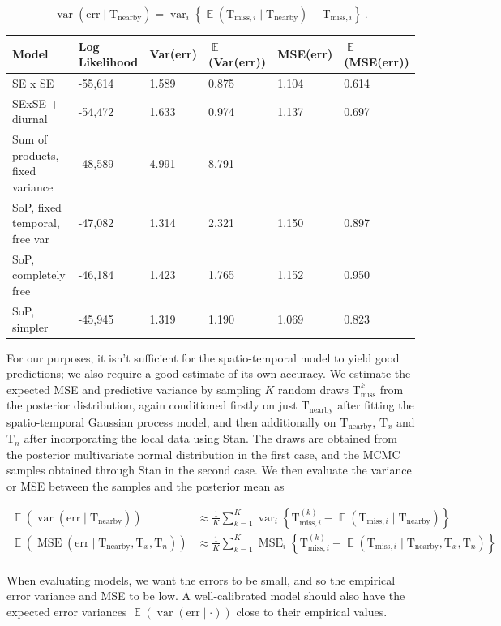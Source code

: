 \documentclass[letter]{article}
\newcommand{\genericdel}[3]{%
      \left#1#3\right#2
    }
\newcommand{\del}[1]{\genericdel(){#1}}
\newcommand{\cbr}[1]{\genericdel\{\}{#1}}
\DeclareMathOperator{\E}{\mathbb{E}}
\DeclareMathOperator{\var}{{var}}
\DeclareMathOperator{\mse}{{MSE}}
\newcommand{\T}{\mathrm{T}}
\newcommand{\Tn}{\T_{n}}
\newcommand{\Tx}{\T_{x}}
\newcommand{\miss}{\mathrm{miss}}
\newcommand{\obs}{\mathrm{nearby}}
\newcommand{\error}{\mathrm{err}}
\begin{document}
\begin{equation}
    \label{eq:varerr}
    \var\del{\error \mid \T_\obs} = \var_i \cbr{\E\del{\T_{\miss,i} \mid \T_\obs} - \T_{\miss,i}}\,.
\end{equation}

\begin{longtable}[]{@{}llllll@{}}
\toprule
Model & Log Likelihood & Var(err) & \(\E\)(Var(err)) & MSE(err) & \(\E\)(MSE(err))\tabularnewline
\midrule
\endhead
SE x SE & -55,614 & 1.589 & 0.875 & 1.104 & 0.614\tabularnewline
SExSE + diurnal & -54,472 & 1.633 & 0.974 & 1.137 & 0.697\tabularnewline
Sum of products, fixed variance & -48,589 & 4.991 & 8.791 & &\tabularnewline
SoP, fixed temporal, free var & -47,082 & 1.314 & 2.321 & 1.150 & 0.897\tabularnewline
SoP, completely free & -46,184 & 1.423 & 1.765 & 1.152 & 0.950\tabularnewline
SoP, simpler & -45,945 & 1.319 & 1.190 & 1.069 & 0.823\tabularnewline
\bottomrule
\end{longtable}

For our purposes, it isn't sufficient for the spatio-temporal model to yield good predictions; we also require a good estimate of its own accuracy.
We estimate the expected MSE and predictive variance by sampling \(K\) random draws \(\T^k_\miss\) from the posterior distribution, again conditioned firstly on just \(\T_\obs\) after fitting the spatio-temporal Gaussian process model, and then additionally on \(\T_\obs\), \(\Tx\) and \(\Tn\) after incorporating the local data using Stan.
The draws are obtained from the posterior multivariate normal distribution in the first case, and the MCMC samples obtained through Stan in the second case.
We then evaluate the variance or MSE between the samples and the posterior mean as

\begin{equation}
\begin{split}
    \E \del{\var\del{\error \mid \T_\obs}} &\approx \frac{1}{K} \sum_{k=1}^K \var_i \cbr{\T^{(k)}_{\miss,i} - \E\del{\T_{\miss,i} \mid \T_\obs}} \\
    \E \del{\mse\del{\error \mid \T_\obs,\Tx,\Tn}} &\approx \frac{1}{K} \sum_{k=1}^K \mse_i \cbr{\T^{(k)}_{\miss,i} - \E\del{\T_{\miss,i} \mid \T_\obs,\Tx,\Tn}} \\
\end{split}
\end{equation}

When evaluating models, we want the errors to be small, and so the empirical error variance and MSE to be low. A well-calibrated model should also have the expected error variances \(\E \del{\var\del{\error \mid \cdot}}\) close to their empirical values.
\end{document}
